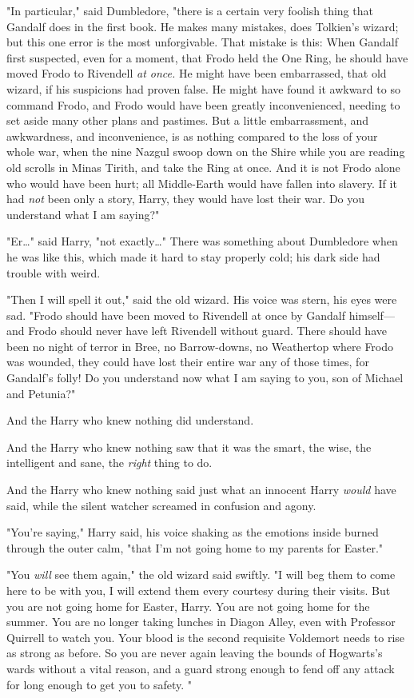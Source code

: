 "In particular," said Dumbledore, "there is a certain very foolish thing that
Gandalf does in the first book. He makes many mistakes, does Tolkien's wizard;
but this one error is the most unforgivable. That mistake is this: When Gandalf
first suspected, even for a moment, that Frodo held the One Ring, he should
have moved Frodo to Rivendell \emph{at once.} He might have been embarrassed,
that old wizard, if his suspicions had proven false. He might have found it
awkward to so command Frodo, and Frodo would have been greatly inconvenienced,
needing to set aside many other plans and pastimes. But a little embarrassment,
and awkwardness, and inconvenience, is as nothing compared to the loss of your
whole war, when the nine Nazgul swoop down on the Shire while you are reading
old scrolls in Minas Tirith, and take the Ring at once. And it is not Frodo
alone who would have been hurt; all Middle-Earth would have fallen into
slavery. If it had \emph{not} been only a story, Harry, they would have lost
their war. Do you understand what I am saying?"

"Er{\ldots}" said Harry, "not exactly{\ldots}" There was something about
Dumbledore when he was like this, which made it hard to stay properly cold; his
dark side had trouble with weird.

"Then I will spell it out," said the old wizard. His voice was stern, his eyes
were sad. "Frodo should have been moved to Rivendell at once by Gandalf
himself---and Frodo should never have left Rivendell without guard. There
should have been no night of terror in Bree, no Barrow-downs, no Weathertop
where Frodo was wounded, they could have lost their entire war any of those
times, for Gandalf's folly! Do you understand now what I am saying to you, son
of Michael and Petunia?"

And the Harry who knew nothing did understand.

And the Harry who knew nothing saw that it was the smart, the wise, the
intelligent and sane, the \emph{right} thing to do.

And the Harry who knew nothing said just what an innocent Harry \emph{would}
have said, while the silent watcher screamed in confusion and agony.

"You're saying," Harry said, his voice shaking as the emotions inside burned
through the outer calm, "that I'm not going home to my parents for Easter."

"You \emph{will} see them again," the old wizard said swiftly. "I will beg them
to come here to be with you, I will extend them every courtesy during their
visits. But you are not going home for Easter, Harry. You are not going home
for the summer. You are no longer taking lunches in Diagon Alley, even with
Professor Quirrell to watch you. Your blood is the second requisite Voldemort
needs to rise as strong as before. So you are never again leaving the bounds of
Hogwarts's wards without a vital reason, and a guard strong enough to fend off
any attack for long enough to get you to safety. "

